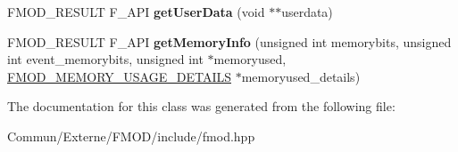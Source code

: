 \begin{DoxyCompactItemize}
\item 
F\+M\+O\+D\+\_\+\+R\+E\+S\+U\+LT F\+\_\+\+A\+PI {\bfseries get\+User\+Data} (void $\ast$$\ast$userdata)\hypertarget{class_f_m_o_d_1_1_system_a04c439bfbbfa385ce819b29b26584fc5}{}\label{class_f_m_o_d_1_1_system_a04c439bfbbfa385ce819b29b26584fc5}

\item 
F\+M\+O\+D\+\_\+\+R\+E\+S\+U\+LT F\+\_\+\+A\+PI {\bfseries get\+Memory\+Info} (unsigned int memorybits, unsigned int event\+\_\+memorybits, unsigned int $\ast$memoryused, \hyperlink{struct_f_m_o_d___m_e_m_o_r_y___u_s_a_g_e___d_e_t_a_i_l_s}{F\+M\+O\+D\+\_\+\+M\+E\+M\+O\+R\+Y\+\_\+\+U\+S\+A\+G\+E\+\_\+\+D\+E\+T\+A\+I\+LS} $\ast$memoryused\+\_\+details)\hypertarget{class_f_m_o_d_1_1_system_a248a17e258aa12ccc32c85c7a5a4f64c}{}\label{class_f_m_o_d_1_1_system_a248a17e258aa12ccc32c85c7a5a4f64c}

\end{DoxyCompactItemize}


The documentation for this class was generated from the following file\+:\begin{DoxyCompactItemize}
\item 
Commun/\+Externe/\+F\+M\+O\+D/include/fmod.\+hpp\end{DoxyCompactItemize}
